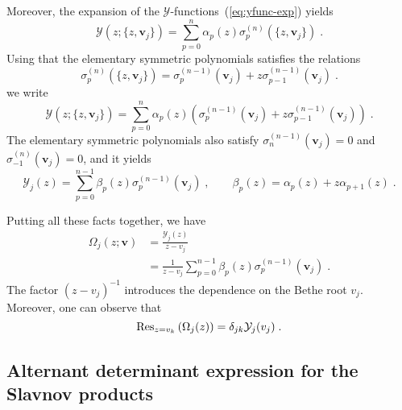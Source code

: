 \documentclass[a4paper,12pt]{amsart}
\begin{document}
Moreover, the expansion of the
\(\mathcal{Y}\)-functions~(\ref{eq:yfunc-exp}) yields
\begin{equation}
  \mathcal{Y}(z; \{z,\bm{v}_j\}) = \sum_{p=0}^n \alpha_p(z) \sigma_p^{(n)}(\{z,\bm{v}_j\})\; . 
\end{equation}
Using that the elementary symmetric polynomials satisfies the
relations
\begin{equation}
  \sigma_p^{(n)}(\{z,\bm{v}_j\}) = \sigma_p^{(n-1)}(\bm{v}_j) + z \sigma_{p-1}^{(n-1)}(\bm{v}_j) \; . 
\end{equation}
we write
\begin{equation}
  \label{eq:y-functions-alpha}
  \mathcal{Y}(z; \{z,\bm{v}_j\})  = 
\sum_{p=0}^{n} \alpha_p(z)
  \left(\sigma_p^{(n-1)}(\bm{v}_j) + z \sigma_{p-1}^{(n-1)}(\bm{v}_j) \right) \; .
\end{equation}
The elementary symmetric polynomials also satisfy
\(\sigma_n^{(n-1)}(\bm{v}_j)=0\) and \(\sigma_{-1}^{(n)}(\bm{v}_j)=
0\), and it yields
\begin{equation}
  \label{eq:y-functions}
  \mathcal{Y}_j(z)  = 
  \sum_{p=0}^{n-1} \beta_p(z) \sigma_p^{(n-1)}(\bm{v}_j) \; , \qquad 
\beta_p(z) = \alpha_p(z) + z \alpha_{p+1}(z) \; .
\end{equation}

Putting all these facts together, we have
\begin{equation}
\begin{split}
  \Omega_{j}(z; \bm{v}) & = \frac{\mathcal{Y}_j(z) }{z - v_j} \\ 
& = \frac{1}{z - v_j} \sum_{p=0}^{n-1} \beta_p(z) \sigma_p^{(n-1)}(\bm{v}_j) \; .
\end{split}
\end{equation}
The factor \((z - v_j)^{-1}\) introduces the dependence on the Bethe root \(v_j\).  
Moreover, one can observe that
\begin{equation}
\operatorname{Res}_{z=v_k} \left( \Omega_j(z)\right) =  \delta_{jk}\mathcal{Y}_j(v_j)\; .
\end{equation}



\subsection{Alternant determinant expression for the Slavnov products}
\end{document}
